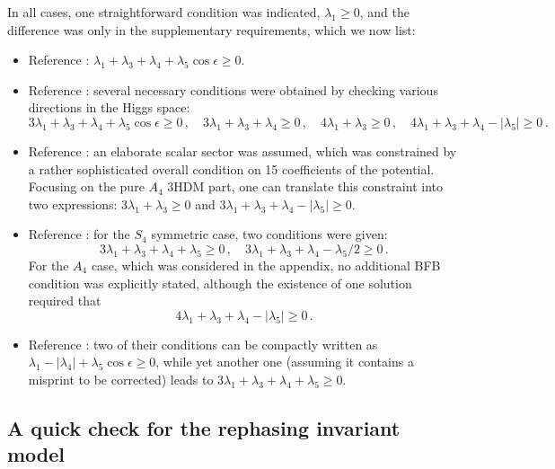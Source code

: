 \documentclass[11pt]{article}
\begin{document}
In all cases, one straightforward condition was indicated, $\lambda_1 \geq 0$, and the difference 
was only in the supplementary requirements, which we now list:
\begin{itemize}
    \item Reference \cite{Toorop:2010ex}:  $\lambda_1 + \lambda_3 + \lambda_4 +\lambda_5 \cos{\epsilon} \geq 0$.
    \item Reference \cite{Dekens:2011}: several necessary conditions were obtained by checking various directions 
    in the Higgs space:
    \begin{equation}
    3\lambda_1 + \lambda_3 + \lambda_4 +\lambda_5 \cos{\epsilon} \geq 0\,, \quad 
    3\lambda_1 + \lambda_3 + \lambda_4 \geq 0\,, \quad 
    4\lambda_1 + \lambda_3 \geq 0\,, \quad 
	4\lambda_1 + \lambda_3 + \lambda_4 - |\lambda_5| \geq 0\,.\label{Dekens}
    \end{equation}
	\item Reference \cite{Boucenna:2011tj}: an elaborate scalar sector was assumed, which was constrained 
	by a rather sophisticated overall condition on 15 coefficients of the potential. 
	Focusing on the pure $A_4$ 3HDM part, one can translate this constraint into two expressions:
	$3\lambda_1 + \lambda_3 \geq 0$ and $3\lambda_1 + \lambda_3 + \lambda_4 -|\lambda_5| \geq 0$. 
    \item Reference \cite{Pramanick:2017wry}: 
    for the $S_4$ symmetric case, two conditions were given:
    \begin{equation}
    3\lambda_1 + \lambda_3 + \lambda_4+ \lambda_5 \geq 0\,, \quad  
    3\lambda_1 + \lambda_3 + \lambda_4 - \lambda_5/2 \geq 0\,.\label{Pramanick-S4}
    \end{equation}
    For the $A_4$ case, which was considered in the appendix, no additional BFB condition was explicitly stated, 
    although the existence of one solution required that 
    \begin{equation}
	4\lambda_1 + \lambda_3 + \lambda_4 - |\lambda_5| \geq 0\,.\label{Pramanick-A4-extra}
	\end{equation}
    \item Reference \cite{Chakrabarty:2018yoy}: two of their conditions can be compactly written as 
    $\lambda_1 - |\lambda_4| +\lambda_5 \cos{\epsilon} \geq 0$, while yet another one (assuming it contains a misprint to be corrected)
    leads to $3\lambda_1 + \lambda_3 + \lambda_4 +\lambda_5 \geq 0$.
\end{itemize}

\subsection{A quick check for the rephasing invariant model}
\end{document}
